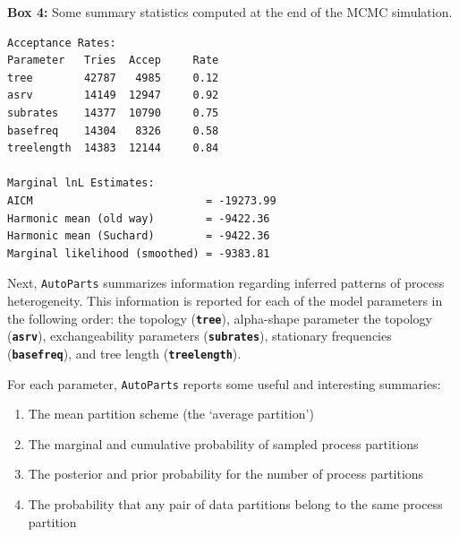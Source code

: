 \documentclass[11pt]{article}
\newcommand{\cl}[1]{{\texttt{\textbf{#1}}}}
\begin{document}
\begin{center}
{\bf Box 4:} Some summary statistics computed at the end of the MCMC simulation. \\
\end{center}
{\tt \scriptsize \begin{framed}
\begin{lstlisting}
Acceptance Rates:
Parameter   Tries  Accep     Rate
tree        42787   4985     0.12
asrv        14149  12947     0.92
subrates    14377  10790     0.75
basefreq    14304   8326     0.58
treelength  14383  12144     0.84

Marginal lnL Estimates:
AICM                           = -19273.99
Harmonic mean (old way)        = -9422.36
Harmonic mean (Suchard)        = -9422.36
Marginal likelihood (smoothed) = -9383.81
\end{lstlisting}
\end{framed}}

Next, \verb!AutoParts! summarizes information regarding inferred patterns of process heterogeneity.
This information is reported for each of the model parameters in the following order: the topology (\cl{tree}), alpha-shape parameter the topology (\cl{asrv}), exchangeability parameters (\cl{subrates}), stationary frequencies (\cl{basefreq}), and tree length (\cl{treelength}).

For each parameter, \verb!AutoParts! reports some useful and interesting summaries:
\begin{enumerate}

\item{The mean partition scheme (the `average partition')} \\ \vspace{-7mm}

\item{The marginal and cumulative probability of sampled process partitions} \\ \vspace{-7mm}

\item{The posterior and prior probability for the number of process partitions} \\ \vspace{-7mm}

\item{The probability that any pair of data partitions belong to the same process partition} \\ \vspace{-7mm}

\end{enumerate}
\end{document}
